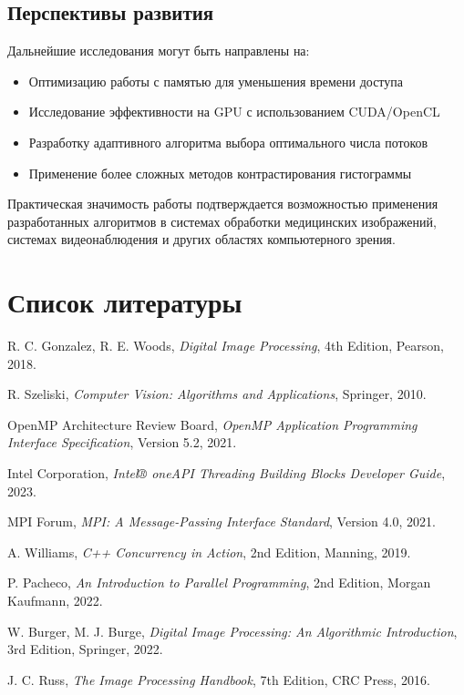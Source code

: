 \documentclass[a4paper,12pt]{article}
\begin{document}
\subsection{Перспективы развития}
Дальнейшие исследования могут быть направлены на:
\begin{itemize}
    \item Оптимизацию работы с памятью для уменьшения времени доступа
    \item Исследование эффективности на GPU с использованием CUDA/OpenCL
    \item Разработку адаптивного алгоритма выбора оптимального числа потоков
    \item Применение более сложных методов контрастирования гистограммы
\end{itemize}


Практическая значимость работы подтверждается возможностью применения разработанных алгоритмов в системах обработки медицинских изображений, системах видеонаблюдения и других областях компьютерного зрения.
\newpage

\section{Список литературы}
\begin{thebibliography}{9}
  R. C. Gonzalez, R. E. Woods, \emph{Digital Image Processing}, 4th Edition, Pearson, 2018.

  R. Szeliski, \emph{Computer Vision: Algorithms and Applications}, Springer, 2010.

  OpenMP Architecture Review Board, \emph{OpenMP Application Programming Interface Specification}, Version 5.2, 2021.

  Intel Corporation, \emph{Intel® oneAPI Threading Building Blocks Developer Guide}, 2023.

  MPI Forum, \emph{MPI: A Message-Passing Interface Standard}, Version 4.0, 2021.

  A. Williams, \emph{C++ Concurrency in Action}, 2nd Edition, Manning, 2019.

  P. Pacheco, \emph{An Introduction to Parallel Programming}, 2nd Edition, Morgan Kaufmann, 2022.

  W. Burger, M. J. Burge, \emph{Digital Image Processing: An Algorithmic Introduction}, 3rd Edition, Springer, 2022.

  J. C. Russ, \emph{The Image Processing Handbook}, 7th Edition, CRC Press, 2016.
\end{thebibliography}
\newpage
\end{document}
